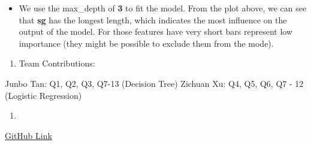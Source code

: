 \documentclass[
  11pt,
  letterpaper,
  DIV=11,
  numbers=noendperiod]{scrartcl}
\providecommand{\tightlist}{%
  \setlength{\itemsep}{0pt}\setlength{\parskip}{0pt}}\usepackage{longtable,booktabs,array}
\begin{document}
\begin{itemize}
\tightlist
\item
  We use the max\_depth of \textbf{3} to fit the model. From the plot
  above, we can see that \textbf{sg} has the longest length, which
  indicates the most influence on the output of the model. For those
  features have very short bars represent low importance (they might be
  possible to exclude them from the mode).
\end{itemize}

\begin{enumerate}
\def\labelenumi{\arabic{enumi}.}
\setcounter{enumi}{14}
\tightlist
\item
  Team Contributions:
\end{enumerate}

Junbo Tan: Q1, Q2, Q3, Q7-13 (Decision Tree) Zichuan Xu: Q4, Q5, Q6, Q7
- 12 (Logistic Regression)

\begin{enumerate}
\def\labelenumi{\arabic{enumi}.}
\setcounter{enumi}{15}
\tightlist
\item
\end{enumerate}

\href{\%22https://github.com/Zichuan66/Assignment-6.git\%22}{GitHub
Link}
\end{document}
